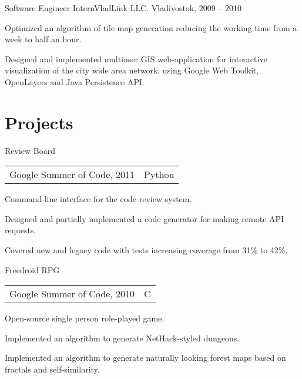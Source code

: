 \documentclass[a4paper]{article}
\begin{document}
\begin{multicols}{2}
  \begin{project1}{Software Engineer Intern}{VladLink LLC. Vladivostok, 2009 -- 2010}
    \begin{items}
    \item Optimized an algorithm of tile map generation reducing the
      working time from a week to half an hour.
    \item Designed and implemented multiuser GIS web-application for
      interactive visualization of the city wide area network, using Google Web
      Toolkit, OpenLayers and Java Persistence API.
    \end{items}
  \end{project1}

\end{multicols}

\section{Projects}
\begin{multicols}{2}
  \raggedcolumns
  \begin{project2}{Review Board}{\begin{tabular}{@{}l|l}Google Summer of Code, 2011 & Python\\\end{tabular}}
    Command-line interface for the code review system.
    \begin{items}
    \item Designed and partially implemented a code generator for making remote API requests.
    \item Covered new and legacy code with tests increasing coverage from 31$\%$ to 42$\%$.
    \end{items}
  \end{project2}

  \columnbreak

  \begin{project2}{Freedroid RPG}{\begin{tabular}{@{}l|l}Google Summer of Code, 2010 & C\\\end{tabular}}
    Open-source single person role-played game.
    \begin{items}
    \item Implemented an algorithm to generate NetHack-styled dungeons.
    \item Implemented an algorithm to generate naturally looking forest maps based on fractals and self-similarity.
    \end{items}
  \end{project2}

\end{multicols}
\end{document}
